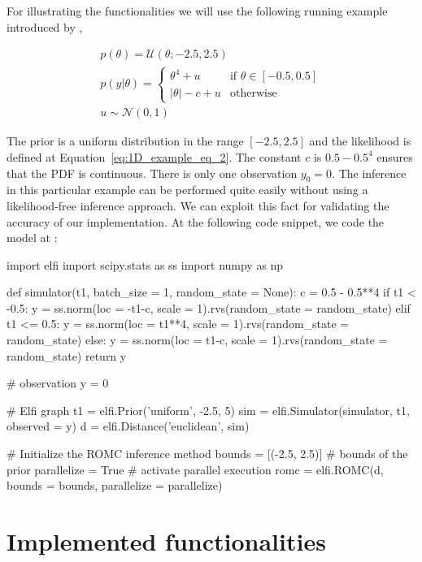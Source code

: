 \documentclass[article, shortnames]{jss}
\begin{document}
For illustrating the functionalities we will use the following running
example introduced by \citet{Ikonomov2019},

\begin{gather} \label{eq:1D_example}
  p(\theta) = \mathcal{U}(\theta;-2.5,2.5)\\ \label{eq:1D_example_eq_2}
  p(y|\theta) = \left\{
    \begin{array}{ll} \theta^4 + u & \mbox{if } \theta \in [-0.5, 0.5]
\\ |\theta| - c + u & \mbox{otherwise}
    \end{array} \right.\\
  u \sim \mathcal{N}(0,1)
\end{gather}

\noindent

The prior is a uniform distribution in the range \([-2.5, 2.5]\) and
the likelihood is defined at Equation~\ref{eq:1D_example_eq_2}. The
constant \(c\) is \(0.5 - 0.5^4\) ensures that the PDF is
continuous. There is only one observation \(y_0 = 0\). The inference
in this particular example can be performed quite easily without using
a likelihood-free inference approach. We can exploit this fact for
validating the accuracy of our implementation. At the following code
snippet, we code the model at :

\begin{Code}
import elfi
import scipy.stats as ss
import numpy as np

def simulator(t1, batch_size = 1, random_state = None):
    c = 0.5 - 0.5**4
    if t1 < -0.5:
        y = ss.norm(loc = -t1-c, scale = 1).rvs(random_state = random_state)
    elif t1 <= 0.5:
        y = ss.norm(loc = t1**4, scale = 1).rvs(random_state = random_state)
    else:
        y = ss.norm(loc = t1-c, scale = 1).rvs(random_state = random_state)
    return y

# observation
y = 0

# Elfi graph
t1 = elfi.Prior('uniform', -2.5, 5)
sim = elfi.Simulator(simulator, t1, observed = y)
d = elfi.Distance('euclidean', sim)

# Initialize the ROMC inference method
bounds = [(-2.5, 2.5)] # bounds of the prior
parallelize = True # activate parallel execution
romc = elfi.ROMC(d, bounds = bounds, parallelize = parallelize)
\end{Code}


\section{Implemented functionalities}
\end{document}
